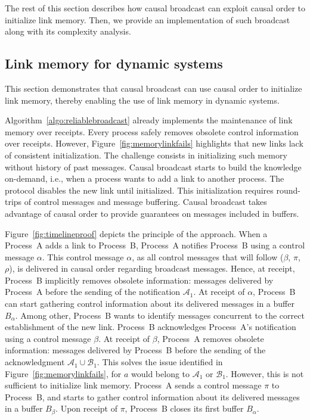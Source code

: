 The rest of this section describes how causal broadcast can exploit causal order
to initialize link memory. Then, we provide an implementation of such
broadcast along with its complexity analysis.

\subsection{Link memory for dynamic systems}


This section demonstrates that causal broadcast can use causal order to
initialize link memory, thereby enabling the use of link memory in dynamic
systems.

Algorithm~\ref{algo:reliablebroadcast} already implements the maintenance of
link memory over receipts. Every process safely removes obsolete control
information over receipts.  However, Figure~\ref{fig:memorylinkfails} highlights
that new links lack of consistent initialization. The challenge consists in
initializing such memory without history of past messages. Causal broadcast
starts to build the knowledge on-demand, i.e., when a process wants to add a
link to another process.  The protocol disables the new link until
initialized. This initialization requires round-trips of control messages and
message buffering.  Causal broadcast takes advantage of causal order to provide
guarantees on messages included in buffers.


Figure~\ref{fig:timelineproof} depicts the principle of the approach. When a
Process~A adds a link to Process~B, Process~A notifies Process~B using a control
message $\alpha$. This control message $\alpha$, as all control messages that
will follow ($\beta$, $\pi$, $\rho$), is delivered in causal order regarding
broadcast messages. Hence, at receipt, Process~B implicitly removes obsolete
information: messages delivered by Process~A before the sending of the
notification $\mathcal{A}_1$.  At receipt of $\alpha$, Process~B can start
gathering control information about its delivered messages in a buffer
$B_\alpha$. Among other, Process~B wants to identify messages concurrent to the
correct establishment of the new link. Process~B acknowledges Process~A's
notification using a control message $\beta$. At receipt of $\beta$, Process~A
removes obsolete information: messages delivered by Process~B before the sending
of the acknowledgment $\mathcal{A}_1 \cup \mathcal{B}_1$. This solves the issue
identified in Figure~\ref{fig:memorylinkfails}, for $a$ would belong to
$\mathcal{A}_1$ or $\mathcal{B}_1$. However, this is not sufficient to
initialize link memory.  Process~A sends a control message $\pi$ to Process~B,
and starts to gather control information about its delivered messages in a
buffer $B_\beta$. Upon receipt of $\pi$, Process~B closes its first buffer
$B_\alpha$.

